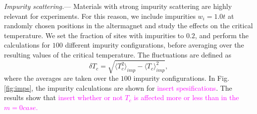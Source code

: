 \documentclass[aps,twocolumn,amsmath,amssymb,preprintnumbers,floatfix,prl,superscriptaddress,longbibliography]{revtex4-2}%
\newcommand{\hans}[1]{\textcolor{Magenta}{{#1}}}
\begin{document}
\textit{Impurity scattering.}---
Materials with strong impurity scattering are highly relevant for experiments. 
For this reason, we include impurities $w_i = 1.0 t$ at randomly chosen positions in the altermagnet and study the effects on the critical temperature. 
We set the fraction of sites with impurities to $0.2$, and perform the calculations for $100$ different impurity configurations, before averaging over the resulting values of the critical temperature.
The fluctuations are defined as
\begin{equation}
    \delta T_c = \sqrt{\langle T_c^2 \rangle_{imp} - \langle T_c \rangle_{imp}^2},
\end{equation}
where the averages are taken over the $100$ impurity configurations.
In Fig. \ref{fig:imps}, the impurity calculations are shown for \hans{insert spesifications}. 
The results show that \hans{insert whether or not $T_c$ is affected more or less than in the $m=0 case$.}
\end{document}
